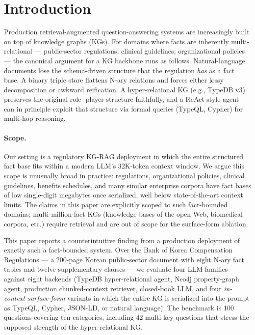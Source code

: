 \section{Introduction}\label{sec:intro}

Production retrieval-augmented question-answering systems are
increasingly built on top of knowledge graphs (KGs). For domains where
facts are inherently multi-relational — public-sector regulations,
clinical guidelines, organizational policies — the canonical argument
for a KG backbone runs as follows. Natural-language documents lose
the schema-driven structure that the regulation \emph{has} as a fact
base. A binary triple store flattens N-ary relations and forces
either lossy decomposition or awkward reification. A
hyper-relational KG (e.g., TypeDB v3) preserves the original role-
player structure faithfully, and a ReAct-style agent can in principle
exploit that structure via formal queries (TypeQL, Cypher) for
multi-hop reasoning.

\paragraph{Scope.} Our setting is a regulatory KG-RAG deployment in
which the entire structured fact base fits within a modern LLM's
32K-token context window. We argue this scope is unusually broad in
practice: regulations, organizational policies, clinical guidelines,
benefits schedules, and many similar enterprise corpora have fact
bases of low single-digit megabytes once serialized, well below
state-of-the-art context limits. The claims in this paper are
explicitly scoped to such fact-bounded domains; multi-million-fact
KGs (knowledge bases of the open Web, biomedical corpora, etc.)
require retrieval and are out of scope for the surface-form ablation.

This paper reports a counterintuitive finding from a production
deployment of exactly such a fact-bounded system. Over the Bank of
Korea Compensation Regulations — a 200-page Korean public-sector
document with eight N-ary fact tables and twelve supplementary
clauses — we evaluate four LLM families against eight backends (TypeDB
hyper-relational agent, Neo4j property-graph agent, production
chunked-context retriever, closed-book LLM, and four
\emph{in-context surface-form} variants in which the entire KG is
serialized into the prompt as TypeQL, Cypher, JSON-LD, or natural
language). The benchmark is 100 questions covering ten categories,
including 42 multi-key questions that stress the supposed strength
of the hyper-relational KG.

